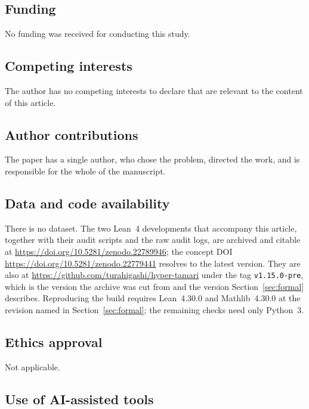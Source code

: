 \documentclass[11pt,a4paper]{article}
\theoremstyle{plain}
\theoremstyle{definition}
\begin{document}
\subsection*{Funding}

No funding was received for conducting this study.

\subsection*{Competing interests}

The author has no competing interests to declare that are relevant to the content of
this article.

\subsection*{Author contributions}

The paper has a single author, who chose the problem, directed the work, and is
responsible for the whole of the manuscript.

\subsection*{Data and code availability}

\begin{sloppypar}
There is no dataset. The two Lean~4 developments that accompany this article, together
with their audit scripts and the raw audit logs, are archived and citable at
\url{https://doi.org/10.5281/zenodo.22789946}; the concept DOI
\url{https://doi.org/10.5281/zenodo.22779441} resolves to the latest version. They are
also at \url{https://github.com/turahigashi/hyper-tamari} under the tag
\verb|v1.15.0-pre|, which is the version the archive was cut from and the version
Section~\ref{sec:formal} describes. Reproducing the build requires Lean~4.30.0 and Mathlib~4.30.0 at the revision
named in Section~\ref{sec:formal}; the remaining checks need only Python~3.
\end{sloppypar}

\subsection*{Ethics approval}

Not applicable.

\subsection*{Use of AI-assisted tools}
\end{document}

